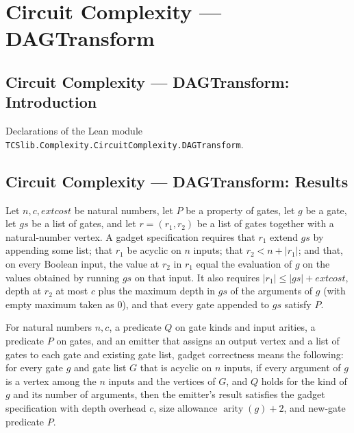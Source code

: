 \section{Circuit Complexity --- DAGTransform}
\subsection*{Circuit Complexity --- DAGTransform: Introduction}

Declarations of the Lean module \texttt{TCSlib.Complexity.CircuitComplexity.DAGTransform}.

\subsection*{Circuit Complexity --- DAGTransform: Results}

\begin{definition}
\label{BoolCircuit.GadgetSpec}
\leanok
{}
Let $n,c,	ext{cost}$ be natural numbers, let $P$ be a property of gates, let $g$ be a
gate, let $gs$ be a list of gates, and let $r=(r_1,r_2)$ be a list of gates together
with a natural-number vertex. A gadget specification requires that $r_1$ extend $gs$ by
appending some list; that $r_1$ be acyclic on $n$ inputs; that $r_2<n+|r_1|$; and that,
on every Boolean input, the value at $r_2$ in $r_1$ equal the evaluation of $g$ on the
values obtained by running $gs$ on that input. It also requires $|r_1|\le|gs|+	ext{cost}$,
depth at $r_2$ at most $c$ plus the maximum depth in $gs$ of the arguments of $g$ (with
empty maximum taken as $0$), and that every gate appended to $gs$ satisfy $P$.
\end{definition}

\begin{definition}
\label{BoolCircuit.GadgetCorrect}
\leanok
{}
For natural numbers $n,c$, a predicate $Q$ on gate kinds and input arities, a predicate
$P$ on gates, and an emitter that assigns an output vertex and a list of gates to each
gate and existing gate list, gadget correctness means the following: for every gate $g$
and gate list $G$ that is acyclic on $n$ inputs, if every argument of $g$ is a vertex
among the $n$ inputs and the vertices of $G$, and $Q$ holds for the kind of $g$ and its
number of arguments, then the emitter's result satisfies the gadget specification with
depth overhead $c$, size allowance $\operatorname{arity}(g)+2$, and new-gate predicate
$P$.
\end{definition}

